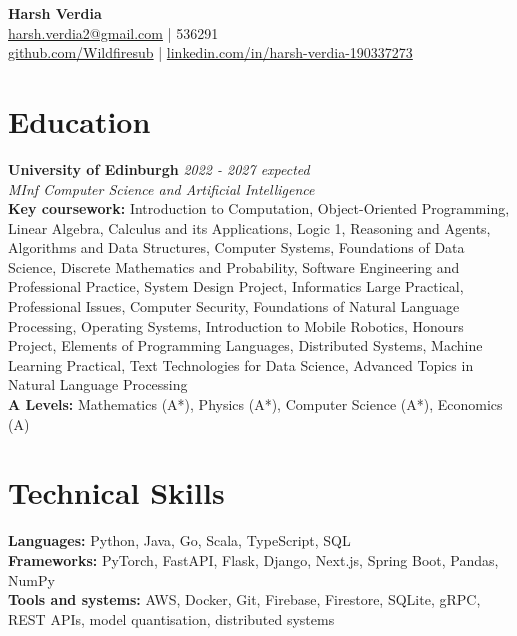 \documentclass[a4paper,10pt]{article}
\begin{document}
\begin{center}
  {\Large \textbf{Harsh Verdia}} \\[4pt]
  \href{mailto:harsh.verdia2@gmail.com}{harsh.verdia2@gmail.com}
  \quad |  536291 \\[2pt]
  \href{https://github.com/Wildfiresub}{github.com/Wildfiresub}
  \quad | \quad \href{https://www.linkedin.com/in/harsh-verdia-190337273/}{linkedin.com/in/harsh-verdia-190337273}
\end{center}

\section*{Education}
\textbf{University of Edinburgh} \hfill \textit{2022 - 2027 expected}\\
\textit{MInf Computer Science and Artificial Intelligence}\\
\textbf{Key coursework:} Introduction to Computation, Object-Oriented Programming, Linear Algebra, Calculus and its Applications, Logic 1, Reasoning and Agents, Algorithms and Data Structures, Computer Systems, Foundations of Data Science, Discrete Mathematics and Probability, Software Engineering and Professional Practice, System Design Project, Informatics Large Practical, Professional Issues, Computer Security, Foundations of Natural Language Processing, Operating Systems, Introduction to Mobile Robotics, Honours Project, Elements of Programming Languages, Distributed Systems, Machine Learning Practical, Text Technologies for Data Science, Advanced Topics in Natural Language Processing\\
\textbf{A Levels:} Mathematics (A*), Physics (A*), Computer Science (A*), Economics (A)

\section*{Technical Skills}
\textbf{Languages:} Python, Java, Go, Scala, TypeScript, SQL \\
\textbf{Frameworks:} PyTorch, FastAPI, Flask, Django, Next.js, Spring Boot, Pandas, NumPy \\
\textbf{Tools and systems:} AWS, Docker, Git, Firebase, Firestore, SQLite, gRPC, REST APIs, model quantisation, distributed systems
\end{document}
